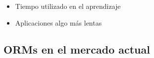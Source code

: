 \documentclass[preprint,12pt]{elsarticle}
\begin{document}
\begin{itemize}

	\item Tiempo utilizado en el aprendizaje
	\item Aplicaciones algo más lentas

\end{itemize}

\subsection{\textbf{ORMs en el mercado actual\\}}
\end{document}
